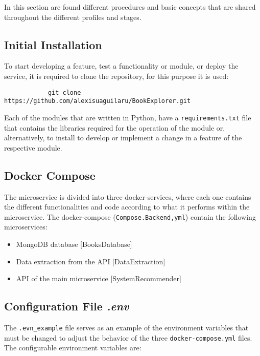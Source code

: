\documentclass[12pt,a4paper]{article}
\begin{document}
    {
        In this section are found different procedures and basic concepts that 
        are shared throughout the different profiles and stages.

        \subsection{Initial Installation}
        {
            To start developing a feature, test a functionality or module, or 
            deploy the service, it is required to clone the repository, for 
            this purpose it is used:

            \begin{verbatim}
            git clone https://github.com/alexisuaguilaru/BookExplorer.git 
            \end{verbatim}

            Each of the modules that are written in Python, have a 
            \verb*|requirements.txt| file that contains the libraries required 
            for the operation of the module or, alternatively, to install to 
            develop or implement a change in a feature of the respective module.
        }

        \subsection{Docker Compose}
        {
            The microservice is divided into three docker-services, 
            where each one contains the different functionalities and 
            code according to what it performs within the microservice. 
            The docker-compose (\verb*|Compose.Backend,yml|) contain the 
            following microservices:

            \begin{itemize}[label=$\bullet$]
                \item MongoDB database [BooksDatabase]
                \item Data extraction from the API [DataExtraction]
                \item API of the main microservice [SystemRecommender]
            \end{itemize}
        }

        \subsection{Configuration File \emph{.env}}\label{sec:ConfEnv}
        {
            The \verb*|.evn_example| file serves as an example of the environment 
            variables that must be changed to adjust the behavior of the three 
            \verb*|docker-compose.yml| files. The configurable environment variables are:

}}
\end{document}
